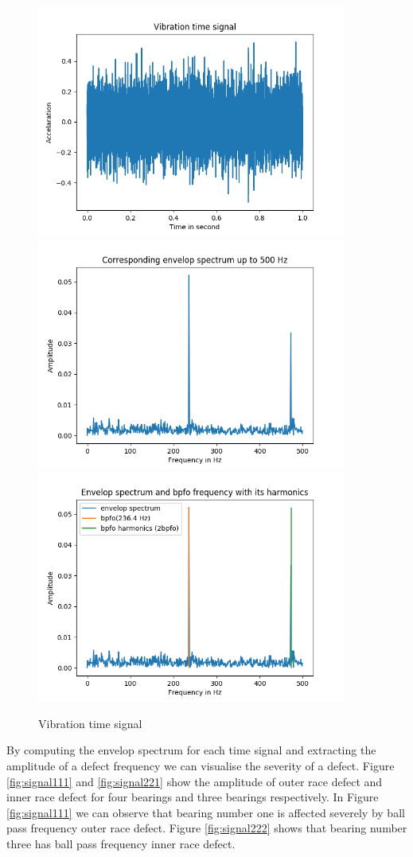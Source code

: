\documentclass[11pt, oneside]{article}   	%
\begin{document}
\begin{figure}[H] %
   \centering
   \includegraphics[width=4in]{time-signal.png} 
   \includegraphics[width=4in]{spectrum.png} 
      \includegraphics[width=4in]{fault.png} 
   \caption{Vibration time signal}
   \label{fig:signal0}
\end{figure}
\begin{flushleft}
By computing the envelop spectrum for each time signal and extracting the amplitude of a defect frequency we can visualise the severity of a defect. Figure \ref{fig:signal111} and \ref{fig:signal221} show the amplitude of outer race defect and inner race defect for four bearings and three bearings respectively. In Figure \ref{fig:signal111} we can observe that bearing number one is affected severely by ball pass frequency outer race defect. Figure \ref{fig:signal222} shows that bearing number three has ball pass frequency inner race defect. 
\end{flushleft}
\end{document}
